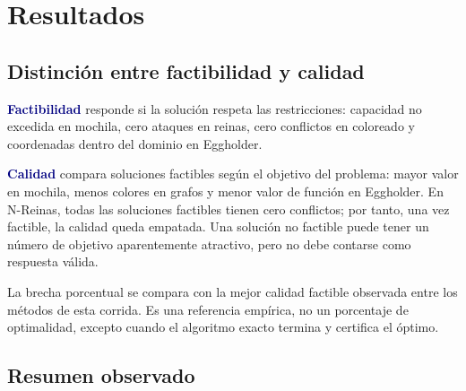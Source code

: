 \documentclass[12pt,letterpaper]{article}
\newcommand{\metric}[1]{\textcolor{navy}{\textbf{#1}}}
\begin{document}
\section{Resultados}

\subsection{Distinción entre factibilidad y calidad}

\metric{Factibilidad} responde si la solución respeta las restricciones:
capacidad no excedida en mochila, cero ataques en reinas, cero conflictos en
coloreado y coordenadas dentro del dominio en Eggholder.

\metric{Calidad} compara soluciones factibles según el objetivo del problema:
mayor valor en mochila, menos colores en grafos y menor valor de función en
Eggholder. En N-Reinas, todas las soluciones factibles tienen cero conflictos;
por tanto, una vez factible, la calidad queda empatada. Una solución no
factible puede tener un número de objetivo aparentemente atractivo, pero no
debe contarse como respuesta válida.

La brecha porcentual se compara con la mejor calidad factible observada entre
los métodos de esta corrida. Es una referencia empírica, no un porcentaje de
optimalidad, excepto cuando el algoritmo exacto termina y certifica el óptimo.

\subsection{Resumen observado}
\end{document}

